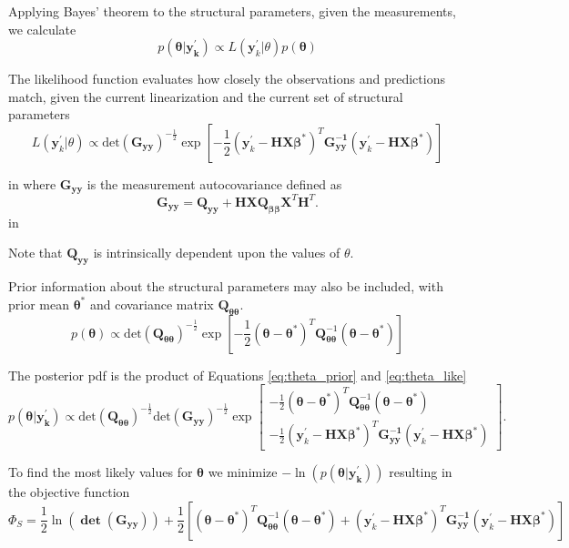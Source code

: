\documentclass[11pt,oneside,onecolumn]{usgsreport}
\begin{document}
\begin{appendix}
Applying Bayes' theorem to the structural parameters, given the measurements,
we calculate
\[
p\left(\mathbf{\theta|\mathbf{y}_{k}^{'}}\right)\propto L\left(\mathbf{y}_{k}^{'}|\theta\right)p\left(\mathbf{\theta}\right)
\]


The likelihood function evaluates how closely the observations and
predictions match, given the current linearization and the current
set of structural parameters
\begin{equation}
L\left(\mathbf{y}_{k}^{'}|\theta\right)\propto\mathrm{det}\left(\mathbf{G_{yy}}\right)^{-\frac{1}{2}}\exp\left[-\frac{1}{2}\left(\mathbf{y}_{k}^{'}-\mathbf{HX\beta^{*}}\right)^{T}\mathbf{G_{yy}^{-1}}\left(\mathbf{y}_{k}^{'}-\mathbf{HX\beta^{*}}\right)\right]\label{eq:theta_like}
\end{equation}

 in
where $\mathbf{G_{yy}}$ is the measurement autocovariance defined
as 
\[
\mathbf{G_{yy}}=\mathbf{Q_{yy}}+\mathbf{HXQ_{\beta\beta}X}^{T}\mathbf{H}^{T}.
\]
 in

Note that $\mathbf{Q_{yy}}$ is intrinsically dependent upon the values
of $\theta.$

Prior information about the structural parameters may also be included,
with prior mean $\mathbf{\theta^{*}}$ and covariance matrix $\mathbf{Q_{\theta\theta}}$.
\begin{equation}
p\left(\mathbf{\theta}\right)\propto\mathrm{det}\left(\mathbf{Q_{\theta\theta}}\right)^{-\frac{1}{2}}\exp\left[-\frac{1}{2}\left(\mathbf{\theta-\theta^{*}}\right)^{T}\mathbf{Q}_{\mathbf{\theta\theta}}^{-1}\left(\mathbf{\theta-\theta^{*}}\right)\right]\label{eq:theta_prior}
\end{equation}


The posterior pdf is the product of Equations \ref{eq:theta_prior}
and \ref{eq:theta_like}
\[
p\left(\mathbf{\theta|\mathbf{y}_{k}^{'}}\right)\propto\mathrm{\mathrm{det}\left(\mathbf{Q_{\theta\theta}}\right)^{-\frac{1}{2}}det}\left(\mathbf{G_{yy}}\right)^{-\frac{1}{2}}\exp\left[\begin{array}{c}
-\frac{1}{2}\left(\mathbf{\theta-\theta^{*}}\right)^{T}\mathbf{Q}_{\mathbf{\theta\theta}}^{-1}\left(\mathbf{\theta-\theta^{*}}\right)\\
-\frac{1}{2}\left(\mathbf{y}_{k}^{'}-\mathbf{HX\beta^{*}}\right)^{T}\mathbf{G_{yy}^{-1}}\left(\mathbf{y}_{k}^{'}-\mathbf{HX\beta^{*}}\right)
\end{array}\right].
\]


To find the most likely values for $\mathbf{\theta}$ we minimize
$-\ln\left(p\left(\mathbf{\theta|\mathbf{y}_{k}^{'}}\right)\right)$
resulting in the objective function
\[
\Phi_{S}=\mathrm{\frac{1}{2}\ln\left(\mathbf{\det\left(G_{yy}\right)}\right)}+\frac{1}{2}\left[\left(\mathbf{\theta-\theta^{*}}\right)^{T}\mathbf{Q}_{\mathbf{\theta\theta}}^{-1}\left(\mathbf{\theta-\theta^{*}}\right)+\left(\mathbf{y}_{k}^{'}-\mathbf{HX\beta^{*}}\right)^{T}\mathbf{G_{yy}^{-1}}\left(\mathbf{y}_{k}^{'}-\mathbf{HX\beta^{*}}\right)\right]
\]



\end{appendix}
\end{document}
